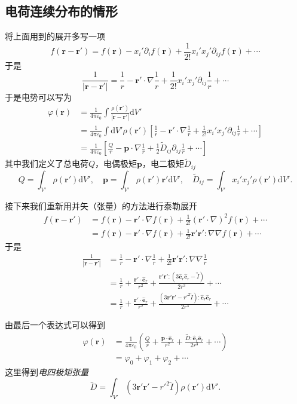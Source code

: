 \documentclass[UTF8]{ctexbook}
\renewcommand{\d}{\mathrm{d}}
\renewcommand{\b}{\boldsymbol}
\renewcommand{\t}{\overleftrightarrow}
\renewcommand{\k}{\frac{1}{4\pi\varepsilon_0}}
\numberwithin{equation}{chapter}
\begin{document}
	\subsection{电荷连续分布的情形}
	将上面用到的展开多写一项
	\[f(\b{r}-\b{r}')=f(\b{r})-x_i'\partial_if(\b{r})+\frac{1}{2!}x_i'x_j'\partial_{ij}f(\b{r})+\cdots\]
	于是
	\[\frac{1}{|\b{r}-\b{r}'|}=\frac{1}{r}-\b{r}'\cdot\nabla\frac{1}{r}+\frac{1}{2!}x_i'x_j'\partial_{ij}\frac{1}{r}+\cdots\]
	于是电势可以写为
	\begin{align*}
		\varphi(\b{r}) &= \k \int \frac{\rho(\b{r}')}{|\b{r}-\b{r}'|}\d V' \\ 
		&=\k \int \d V' \rho(\b{r}')\left[ \frac{1}{r}-\b{r}'\cdot\nabla\frac{1}{r}+\frac{1}{2!}x_i'x_j'\partial_{ij}\frac{1}{r}+\cdots\right] \\
		&=\k\left[\frac{Q}{r}-\b{p}\cdot\nabla\frac{1}{r}+\frac{1}{2}\tilde{D}_{ij}\partial_{ij}\frac{1}{r}+\cdots\right]
	\end{align*}
	其中我们定义了总电荷$Q$，电偶极矩$\b{p}$，电二极矩$\tilde{D}_{ij}$
	\[Q=\int_{V'}\rho(\b{r}')\d V',\quad \b{p}=\int_{V'}\rho(\b{r}')\b{r}'\d V',\quad \tilde{D}_{ij}=\int_{V'}x_i'x_j'\rho(\b{r}')\d V'.\]
	
	接下来我们重新用并矢（张量）的方法进行泰勒展开
	\begin{align*}
		f(\b{r}-\b{r}')&=f(\b{r})-\b{r}'\cdot\nabla f(\b{r})+\frac{1}{2!}(\b{r}'\cdot\nabla)^2f(\b{r})+\cdots \\
		&=f(\b{r})-\b{r}'\cdot\nabla f(\b{r})+\frac{1}{2!}\b{r}'\b{r}':\nabla\nabla f(\b{r})+\cdots
	\end{align*}
	于是
	\begin{align*}
		\frac{1}{|\b{r}-\b{r}'|}&=\frac{1}{r}-\b{r}'\cdot\nabla\frac{1}{r}+\frac{1}{2!}\b{r}'\b{r}':\nabla\nabla\frac{1}{r} \\
		&=\frac{1}{r}+\frac{\b{r}'\cdot\hat{\b{e}}_r}{r^2}+\frac{\b{r}'\b{r}':(3\hat{\b{e}}_r\hat{\b{e}}_r-\t{I})}{2r^3}+\cdots \\
		&=\frac{1}{r}+\frac{\b{r}'\cdot\hat{\b{e}}_r}{r^2}+\frac{(3\b{r}'\b{r}'-r'^2\t{I}):\hat{\b{e}}_r\hat{\b{e}}_r}{2r^3}+\cdots
	\end{align*}

	由最后一个表达式可以得到
	\begin{align*}
		\varphi(\b{r})&=\k \left( \frac{Q}{r} +\frac{\b{p}\cdot\hat{\b{e}}_r}{r^2}+\frac{\t{D}:\hat{\b{e}}_r\hat{\b{e}}_r}{2r^3}+\cdots\right) \\
		&=\varphi_0+\varphi_1+\varphi_2+\cdots
	\end{align*}
	这里得到\emph{电四极矩张量}
	\[\t{D}=\int_{V'}(3\b{r}'\b{r}'-r'^2\t{I})\rho(\b{r}')\d V'.\]
	
\end{document}
